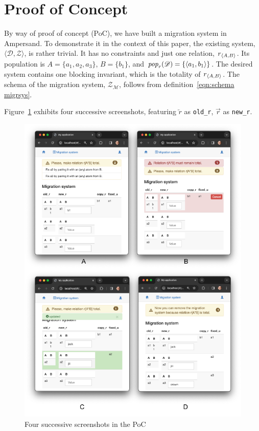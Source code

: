 \documentclass[runningheads]{llncs}
\newcommand{\id}[1]{\text{\it #1\/}}
\newcommand{\popF}[1]{\id{pop}_{#1}}
\newcommand{\pop}[2]{\popF{#1}(#2)}
\newcommand{\declare}[3]{\id{#1}_{\pair{#2}{#3}}}
\newcommand{\pair}[2]{\langle{#1},{#2}\rangle}
\newcommand{\dataset}{\mathscr{D}}
\newcommand{\schema}{\mathscr{Z}}
\newcommand{\migrsys}{\mathscr{M}}
\begin{document}
\section{Proof of Concept}
\label{sct:PoC}
   By way of proof of concept (PoC), we have built a migration system in Ampersand.
   To demonstrate it in the context of this paper, the existing system, $\pair{\dataset}{\schema}$, is rather trivial.
   It has no constraints and just one relation, $\declare{r}{A}{B}$.
   Its population is $A=\{a_1,a_2,a_3\}$, $B=\{b_1\}$, and $\pop{r}{\dataset}=\{\pair{a_1}{b_1}\}$.
   The desired system contains one blocking invariant, which is the totality of $\declare{r}{A}{B}$.
   The schema of the migration system, $\schema_\migrsys$, follows from definition~\ref{eqn:schema migrsys}.

   Figure~\ref{fig:PoC} exhibits four successive screenshots,
   featuring $\overleftarrow{r}$ as {\small\verb#old_r#},
   $\overrightarrow{r}$ as {\small\verb#new_r#}.
\begin{figure}[bht]
   \begin{center}
      \includegraphics[scale=0.9]{figures/screenshots2x2.pdf}
   \end{center}
   \caption{Four successive screenshots in the PoC}
   \label{fig:PoC}
\end{figure}
\end{document}
